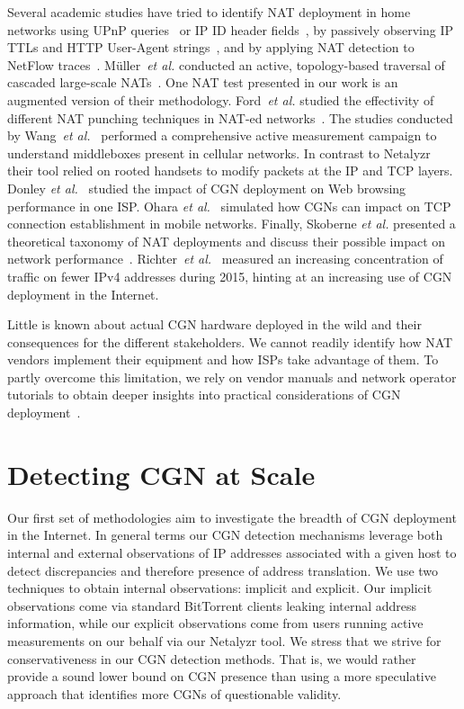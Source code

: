 \documentclass[10pt]{sig-alternate-05-2015}
\providecommand{\etal}{\emph{et al.}\xspace}
\begin{document}
Several academic studies have tried to identify NAT deployment in home 
networks using UPnP queries~\cite{dicioccio2012probe,nat444pam}
or IP ID header fields~\cite{nat_detection_ipid:imw}, by passively
observing IP TTLs and HTTP User-Agent strings~\cite{residential_nat:pam}, and
by applying NAT detection to NetFlow traces~\cite{natdection_passive:conext}.
M{\"u}ller~\etal conducted an active, topology-based traversal of cascaded
large-scale NATs~\cite{muller2013analysis}. One NAT test presented in our work 
is an augmented version of their methodology. Ford~\etal 
studied the effectivity of different NAT punching techniques in NAT-ed 
networks~\cite{fordHolePunching}. 
The studies conducted by Wang~\etal~\cite{Wang:2011:USM:2043164.2018479} 
performed a comprehensive active measurement campaign to understand middleboxes
present in cellular networks. In contrast to Netalyzr their tool
relied on rooted handsets to modify packets at the IP and TCP layers. Donley 
\etal~\cite{cgnimpactwebbrowsing} studied the 
impact of CGN deployment on Web browsing performance in one ISP. Ohara 
\etal~\cite{ohara2014cgnmobile} simulated how CGNs can impact on TCP connection 
establishment in mobile networks. Finally, Skoberne \etal presented a 
theoretical taxonomy of NAT deployments and discuss their possible impact on 
network performance~\cite{address_sharing_ton}.  
Richter~\etal~\cite{IMC2016Beyond} measured an increasing concentration of 
traffic on fewer IPv4 addresses during 2015, hinting at an
increasing use of CGN deployment in the Internet.

Little is known about actual CGN hardware deployed in the wild and their 
consequences for the different stakeholders. We cannot readily identify how NAT 
vendors implement their equipment and how ISPs take advantage of them. To 
partly overcome this limitation, we rely on vendor manuals and network operator 
tutorials to obtain deeper insights into practical considerations of CGN
deployment~\cite{cisconat,a10nat,nat44and444,cgn_menog}.

\section{Detecting CGN at Scale}
\label{sec:cgndetection}

Our first set of methodologies aim to investigate the breadth of CGN
deployment in the Internet.  In general terms our CGN detection
mechanisms leverage both internal and external observations of IP
addresses associated with a given host to detect discrepancies and
therefore presence of address translation.  We use two techniques to
obtain internal observations: implicit and explicit.  Our implicit
observations come via standard BitTorrent clients leaking internal
address information, while our explicit observations come from users
running active measurements on our behalf via our Netalyzr tool.  We
stress that we strive for conservativeness in our CGN detection
methods.  That is, we would rather provide a sound lower bound on
CGN presence than using a more speculative approach that
identifies more CGNs of questionable validity.
\end{document}
